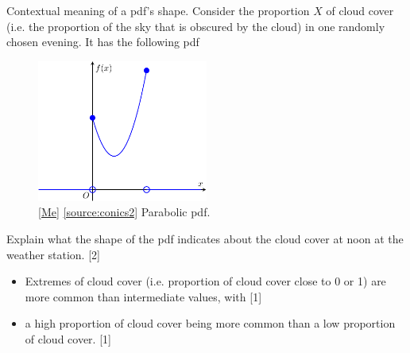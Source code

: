 \begin{example}{Contextual meaning of a pdf's shape.}{}
  Consider the proportion \(X\) of cloud cover (i.e. the proportion of the sky that is obscured by the cloud) in one randomly chosen evening. It has the following pdf
  \begin{figure}[H]
    \centering
    \includegraphics[width=0.5\textwidth]{../Diagrams/Parabolic-probability-density-function/parabolic-pdf.pdf}
    \caption{\ref{Me} \ref{source:conics2} Parabolic pdf.}
    \label{fig:parabolic-pdf}
  \end{figure}
  Explain what the shape of the pdf indicates about the cloud cover at noon at the weather station. \hspace*{\fill} [2]
  \begin{itemize}
    \item Extremes of cloud cover (i.e. proportion of cloud cover close to 0 or 1) are more common than intermediate values, with \hspace*{\fill} [1]
    \item a high proportion of cloud cover being more common than a low proportion of cloud cover. \hspace*{\fill} [1]
  \end{itemize}
\end{example}